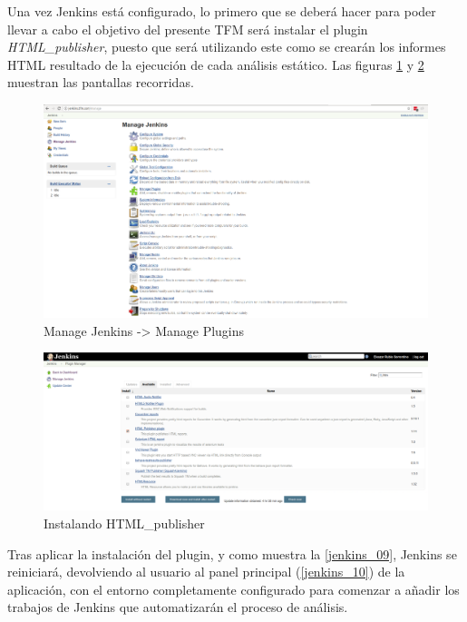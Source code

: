 Una vez Jenkins está configurado, lo primero que se deberá hacer para poder llevar a cabo el objetivo del presente \gls{TFM} será instalar el plugin \textit{HTML\_publisher}, puesto que será utilizando este como se crearán los informes HTML resultado de la ejecución de cada análisis estático. Las figuras \ref{jenkins_07} y \ref{jenkins_08} muestran las pantallas recorridas.

\begin{figure}[htbp]
	\centering
	\includegraphics[width=1.0\linewidth]
	{desarrollo/figuras/jenkins_07.png}
	\caption{Manage Jenkins -> Manage Plugins}
	\label{jenkins_07}
\end{figure}

\begin{figure}[htbp]
	\centering
	\includegraphics[width=1.0\linewidth]
	{desarrollo/figuras/jenkins_08.png}
	\caption{Instalando HTML\_publisher}
	\label{jenkins_08}
\end{figure}

Tras aplicar la instalación del plugin, y como muestra la \autoref{jenkins_09}, Jenkins se reiniciará, devolviendo al usuario al panel principal (\autoref{jenkins_10}) de la aplicación, con el entorno completamente configurado para comenzar a añadir los trabajos de Jenkins que automatizarán el proceso de análisis.

